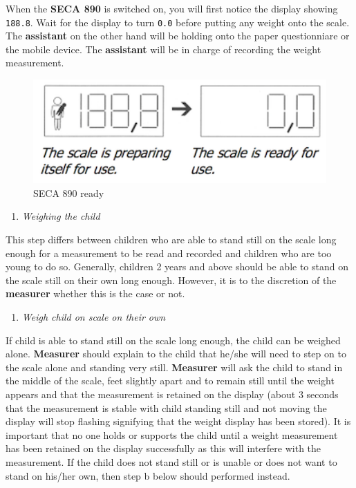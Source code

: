 \documentclass[12pt,]{book}
\providecommand{\tightlist}{%
  \setlength{\itemsep}{0pt}\setlength{\parskip}{0pt}}
\begin{document}
When the \textbf{SECA 890} is switched on, you will first notice the
display showing \texttt{188.8}. Wait for the display to turn
\texttt{0.0} before putting any weight onto the scale. The
\textbf{assistant} on the other hand will be holding onto the paper
questionniare or the mobile device. The \textbf{assistant} will be in
charge of recording the weight measurement.

\begin{figure}

{\centering \includegraphics[width=4.86in]{images/seca890zero} 

}

\caption{SECA 890 ready}\label{fig:unnamed-chunk-8}
\end{figure}

\begin{enumerate}
\def\labelenumi{\arabic{enumi}.}
\setcounter{enumi}{2}
\tightlist
\item
  \emph{Weighing the child}
\end{enumerate}

This step differs between children who are able to stand still on the
scale long enough for a measurement to be read and recorded and children
who are too young to do so. Generally, children 2 years and above should
be able to stand on the scale still on their own long enough. However,
it is to the discretion of the \textbf{measurer} whether this is the
case or not.

\begin{enumerate}
\def\labelenumi{\alph{enumi}.}
\tightlist
\item
  \emph{Weigh child on scale on their own}
\end{enumerate}

If child is able to stand still on the scale long enough, the child can
be weighed alone. \textbf{Measurer} should explain to the child that
he/she will need to step on to the scale alone and standing very still.
\textbf{Measurer} will ask the child to stand in the middle of the
scale, feet slightly apart and to remain still until the weight appears
and that the measurement is retained on the display (about 3 seconds
that the measurement is stable with child standing still and not moving
the display will stop flashing signifying that the weight display has
been stored). It is important that no one holds or supports the child
until a weight measurement has been retained on the display successfully
as this will interfere with the measurement. If the child does not stand
still or is unable or does not want to stand on his/her own, then step b
below should performed instead.
\end{document}
